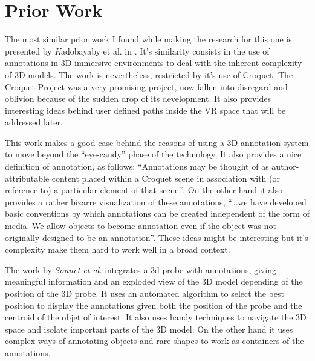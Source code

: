 \section{Prior Work}
The most similar prior work I found while making the research for this one is presented by {\emph Kadobayaby et al.} in \cite{Kadobayashi}. It's similarity consists in the use of annotations in 3D immersive environments to deal with the inherent complexity of 3D models. The work is nevertheless, restricted by it's use of Croquet. The Croquet Project was a very promising project, now fallen into disregard and oblivion because of the sudden drop of its development. It also provides interesting ideas behind user defined paths inside the VR space that will be addressed later.

This work makes a good case behind the reasons of using a 3D annotation system to move beyond the ``eye-candy'' phase of the technology. It also provides a nice definition of annotation, as follows: ``Annotations may be thought of as author- attributable content placed within a Croquet scene in association with (or reference to) a particular element of that scene.''. On the other hand it also provides a rather bizarre visualization of these annotations, ``...we have developed basic conventions by which annotations can be created independent of the form of media. We allow objects to become annotation even if the object was not originally designed to be an annotation''. These ideas might be interesting but it's complexity make them hard to work well in a broad context.

The work by {\em Sonnet et al.} \cite{Sonnet} integrates a 3d probe with annotations, giving meaningful information and an exploded view of the 3D model depending of the position of the 3D probe. It uses an automated algorithm to select the best position to display the annotations given both the position of the probe and the centroid of the objet of interest. It also uses handy techniques to navigate the 3D space and isolate important parts of the 3D model. On the other hand it uses complex ways of annotating objects and rare shapes to work as containers of the annotations.

